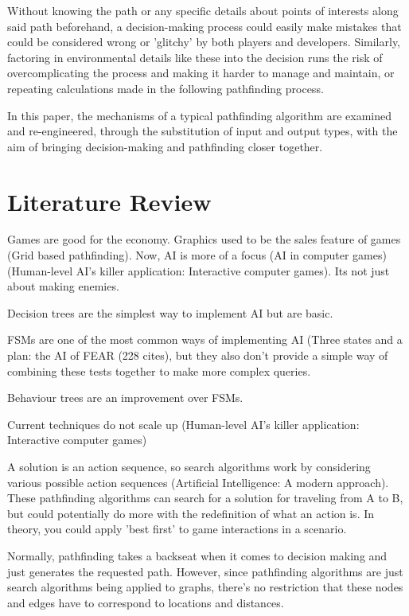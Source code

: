 \documentclass[10pt, twocolumn]{article}
\begin{document}
Without knowing the path or any specific details about points of interests along said path beforehand, a decision-making process could easily make mistakes that could be considered wrong or 'glitchy' by both players and developers. Similarly, factoring in environmental details like these into the decision runs the risk of overcomplicating the process and making it harder to manage and maintain, or repeating calculations made in the following pathfinding process.

In this paper, the mechanisms of a typical pathfinding algorithm are examined and re-engineered, through the substitution of input and output types, with the aim of bringing decision-making and pathfinding closer together.

\section{Literature Review}

Games are good for the economy. Graphics used to be the sales feature of games (Grid based pathfinding). Now, AI is more of a focus (AI in computer games) (Human-level AI's killer application: Interactive computer games). Its not just about making enemies.

Decision trees are the simplest way to implement AI but are basic.

FSMs are one of the most common ways of implementing AI (Three states and a plan: the AI of FEAR (228 cites), but they also don't provide a simple way of combining these tests together to make more complex queries.

Behaviour trees are an improvement over FSMs.

Current techniques do not scale up (Human-level AI's killer application: Interactive computer games)

A solution is an action sequence, so search algorithms work by considering various possible action sequences (Artificial Intelligence: A modern approach). These pathfinding algorithms can search for a solution for traveling from A to B, but could potentially do more with the redefinition of what an action is. In theory, you could apply 'best first' to game interactions in a scenario.

Normally, pathfinding takes a backseat when it comes to decision making and just generates the requested path. However, since pathfinding algorithms are just search algorithms being applied to graphs, there's no restriction that these nodes and edges have to correspond to locations and distances.
\end{document}
